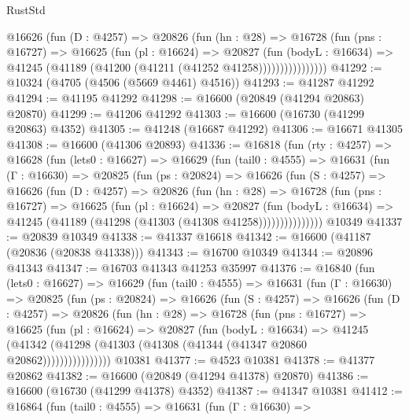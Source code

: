 \begin{lexlean}{RustStd}
\begin{coremodule}
                @16626
                  (fun (D : @4257) =>
                  @20826
                    (fun (hn : @28) =>
                    @16728
                      (fun (pns : @16727) =>
                      @16625
                        (fun (pl : @16624) =>
                        @20827
                          (fun (bodyL : @16634) =>
                          @41245 (@41189 (@41200 (@41211 (@41252 @41258))))))))))))))))
@41292 := @10324 (@4705 (@4506 (@5669 @4461) @4516))
@41293 := @41287 @41292
@41294 := @41195 @41292
@41298 := @16600 (@20849 (@41294 @20863) @20870)
@41299 := @41206 @41292
@41303 := @16600 (@16730 (@41299 @20863) @4352)
@41305 := @41248 (@16687 @41292)
@41306 := @16671 @41305
@41308 := @16600 (@41306 @20893)
@41336 := @16818
    (fun (rty : @4257) =>
    @16628
      (fun (lets0 : @16627) =>
      @16629
        (fun (tail0 : @4555) =>
        @16631
          (fun (Γ : @16630) =>
          @20825
            (fun (ps : @20824) =>
            @16626
              (fun (S : @4257) =>
              @16626
                (fun (D : @4257) =>
                @20826
                  (fun (hn : @28) =>
                  @16728
                    (fun (pns : @16727) =>
                    @16625
                      (fun (pl : @16624) =>
                      @20827
                        (fun (bodyL : @16634) =>
                        @41245 (@41189 (@41298 (@41303 (@41308 @41258)))))))))))))))
    @10349
@41337 := @20839 @10349
@41338 := @41337 @16618
@41342 := @16600 (@41187 (@20836 (@20838 @41338)))
@41343 := @16700 @10349
@41344 := @20896 @41343
@41347 := @16703 @41343 @41253 @35997
@41376 := @16840
    (fun (lets0 : @16627) =>
    @16629
      (fun (tail0 : @4555) =>
      @16631
        (fun (Γ : @16630) =>
        @20825
          (fun (ps : @20824) =>
          @16626
            (fun (S : @4257) =>
            @16626
              (fun (D : @4257) =>
              @20826
                (fun (hn : @28) =>
                @16728
                  (fun (pns : @16727) =>
                  @16625
                    (fun (pl : @16624) =>
                    @20827
                      (fun (bodyL : @16634) =>
                      @41245
                        (@41342
                          (@41298 (@41303 (@41308 (@41344 (@41347 @20860 @20862))))))))))))))))
    @10381
@41377 := @4523 @10381
@41378 := @41377 @20862
@41382 := @16600 (@20849 (@41294 @41378) @20870)
@41386 := @16600 (@16730 (@41299 @41378) @4352)
@41387 := @41347 @10381
@41412 := @16864
    (fun (tail0 : @4555) =>
    @16631
      (fun (Γ : @16630) =>

\end{coremodule}
\end{lexlean}
